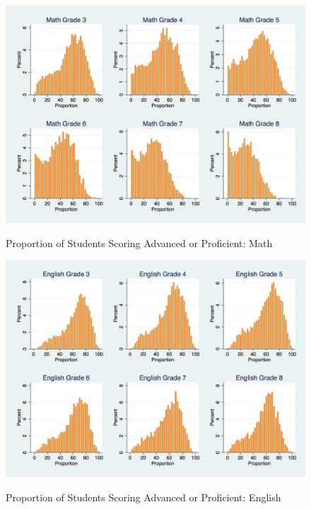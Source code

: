 \documentclass[12pt]{report}
\begin{document}
\begin{figure}[!htb]
    \centering
      \caption{Proportion of Students Scoring Advanced or Proficient: Math}
    \includegraphics[frame, scale=0.25]{math_performance_distribution.png}
    \label{fig:my_label}
\end{figure}
 \clearpage
\begin{figure}[!htb]
    \centering
      \caption{Proportion of Students Scoring Advanced or Proficient: English}
    \includegraphics[frame, scale=0.25]{english_performance_distribution.png}
    \label{fig:my_label}
\end{figure}
\clearpage
\end{document}
